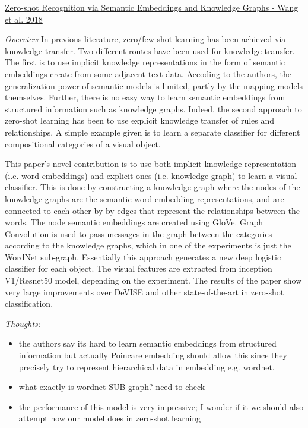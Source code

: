 \documentclass{report}
\begin{document}
\underline{Zero-shot Recognition via Semantic Embeddings and Knowledge Graphs - Wang et al. 2018}

\textit{Overview}
In previous literature, zero/few-shot learning has been achieved via knowledge transfer. Two different routes have been used for knowledge transfer. The first is to use implicit knowledge representations in the form of semantic embeddings create from some adjacent text data. Accoding to the authors, the generalization power of semantic models is limited, partly by the mapping models themselves. Further, there is no easy way to learn semantic embeddings from structured information such as knowledge graphs. Indeed, the second approach to zero-shot learning has been to use explicit knowledge transfer of rules and relationships. A simple example given is to learn a separate classifier for different compositional categories of a visual object.

This paper's novel contribution is to use both implicit knowledge representation (i.e. word embeddings) and explicit ones (i.e. knowledge graph) to learn a visual classifier. This is done by constructing a knowledge graph where the nodes of the knowledge graphs are the semantic word embedding representations, and are connected to each other by by edges that represent the relationships between the words. The node semantic embeddings are created using GloVe. Graph Convolution is used to pass messages in the graph between the categories according to the knowledge graphs, which in one of the experiments is just the WordNet sub-graph. Essentially this approach generates a new deep logistic classifier for each object. The visual features are extracted from inception V1/Resnet50 model, depending on the experiment. The results of the paper show very large improvements over DeVISE and other state-of-the-art in zero-shot classification. 

\textit{Thoughts:}

\begin{itemize}
\item the authors say its hard to learn semantic embeddings from structured information but actually Poincare embedding should allow this since they precisely try to represent hierarchical data in embedding e.g. wordnet.
\item what exactly is wordnet SUB-graph? need to check
\item the performance of this model is very impressive; I wonder if it we should also attempt how our model does in zero-shot learning
\end{itemize}
\end{document}
